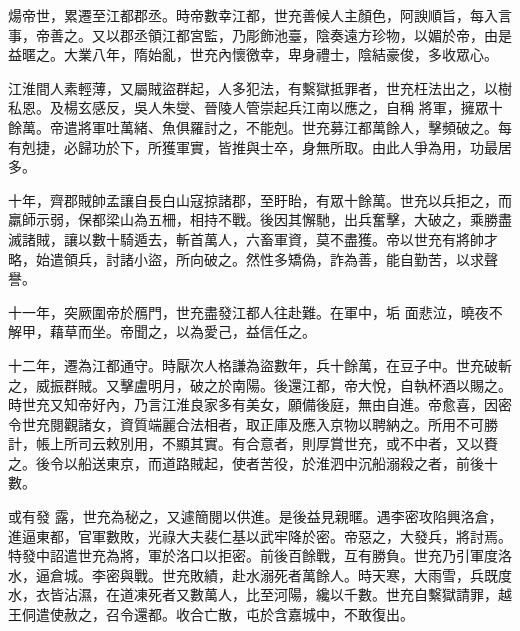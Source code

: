 \begin{pinyinscope}
 煬帝世，累遷至江都郡丞。時帝數幸江都，世充善候人主顏色，阿諛順旨，每入言事，帝善之。又以郡丞領江都宮監，乃彫飾池臺，陰奏遠方珍物，以媚於帝，由是益暱之。大業八年，隋始亂，世充內懷徼幸，卑身禮士，陰結豪俊，多收眾心。



 江淮間人素輕薄，又屬賊盜群起，人多犯法，有繫獄抵罪者，世充枉法出之，以樹私恩。及楊玄感反，吳人朱燮、晉陵人管崇起兵江南以應之，自稱
 將軍，擁眾十餘萬。帝遣將軍吐萬緒、魚俱羅討之，不能剋。世充募江都萬餘人，擊頻破之。每有剋捷，必歸功於下，所獲軍實，皆推與士卒，身無所取。由此人爭為用，功最居多。



 十年，齊郡賊帥孟讓自長白山寇掠諸郡，至盱眙，有眾十餘萬。世充以兵拒之，而羸師示弱，保都梁山為五柵，相持不戰。後因其懈馳，出兵奮擊，大破之，乘勝盡滅諸賊，讓以數十騎遁去，斬首萬人，六畜軍資，莫不盡獲。帝以世充有將帥才略，始遣領兵，討諸小盜，所向破之。然性多矯偽，詐為善，能自勤苦，以求聲譽。



 十一年，突厥圍帝於鴈門，世充盡發江都人往赴難。在軍中，垢
 面悲泣，曉夜不解甲，藉草而坐。帝聞之，以為愛己，益信任之。



 十二年，遷為江都通守。時厭次人格謙為盜數年，兵十餘萬，在豆子中。世充破斬之，威振群賊。又擊盧明月，破之於南陽。後還江都，帝大悅，自執杯酒以賜之。時世充又知帝好內，乃言江淮良家多有美女，願備後庭，無由自進。帝愈喜，因密令世充閱觀諸女，資質端麗合法相者，取正庫及應入京物以聘納之。所用不可勝計，帳上所司云敕別用，不顯其實。有合意者，則厚賞世充，或不中者，又以賚之。後令以船送東京，而道路賊起，使者苦役，於淮泗中沉船溺殺之者，前後十數。



 或有發
 露，世充為秘之，又遽簡閱以供進。是後益見親暱。遇李密攻陷興洛倉，進逼東都，官軍數敗，光祿大夫裴仁基以武牢降於密。帝惡之，大發兵，將討焉。特發中詔遣世充為將，軍於洛口以拒密。前後百餘戰，互有勝負。世充乃引軍度洛水，逼倉城。李密與戰。世充敗績，赴水溺死者萬餘人。時天寒，大雨雪，兵既度水，衣皆沾濕，在道凍死者又數萬人，比至河陽，纔以千數。世充自繫獄請罪，越王侗遣使赦之，召令還都。收合亡散，屯於含嘉城中，不敢復出。




\end{pinyinscope}
